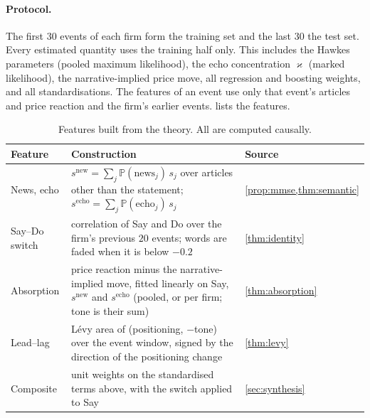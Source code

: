 \documentclass{article}
\theoremstyle{plain}
\theoremstyle{definition}
\theoremstyle{remark}
\newcommand{\Prob}{\mathbb{P}}
\begin{document}
\paragraph{Protocol.} The first $30$ events of each firm form the training set and the last $30$ the test set. Every estimated quantity uses the training half only. This includes the Hawkes parameters (pooled maximum likelihood), the echo concentration $\varkappa$ (marked likelihood), the narrative-implied price move, all regression and boosting weights, and all standardisations. The features of an event use only that event's articles and price reaction and the firm's earlier events.  lists the features.

\begin{table}[ht]
\centering
\caption{Features built from the theory. All are computed causally.}
\label{tab:features}
\small
\begin{tabularx}{\textwidth}{@{}l>{\raggedright\arraybackslash}Xl@{}}
\toprule
Feature & Construction & Source \\
\midrule
News, echo & $s^{\text{new}}=\sum_j\Prob(\text{news}_j)\,s_j$ over articles other than the statement; $s^{\text{echo}}=\sum_j\Prob(\text{echo}_j)\,s_j$ & \cref{prop:mmse,thm:semantic} \\
Say--Do switch & correlation of Say and Do over the firm's previous $20$ events; words are faded when it is below $-0.2$ & \cref{thm:identity} \\
Absorption & price reaction minus the narrative-implied move, fitted linearly on Say, $s^{\text{new}}$ and $s^{\text{echo}}$ (pooled, or per firm; tone is their sum) & \cref{thm:absorption} \\
Lead--lag & L\'evy area of (positioning, $-$tone) over the event window, signed by the direction of the positioning change & \cref{thm:levy} \\
Composite & unit weights on the standardised terms above, with the switch applied to Say & \cref{sec:synthesis} \\
\bottomrule
\end{tabularx}
\end{table}
\end{document}
